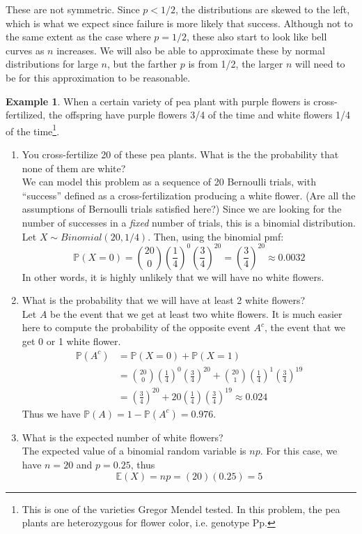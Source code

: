 \documentclass[12pt]{article}
\theoremstyle{definition}
\newtheorem*{example}{Example}
\theoremstyle{remark}
\def\P{{\mathbb P}}
\def\E{{\mathbb E}}
\begin{document}
These are not symmetric. Since $p < 1/2$, the distributions are skewed to the left, which is what we expect since failure is more likely that success. Although not to the same extent as the case where $p = 1/2$, these also start to look like bell curves as $n$ increases. We will also be able to approximate these by normal distributions for large $n$, but the farther $p$ is from 1/2, the larger $n$ will need to be for this approximation to be reasonable.

\begin{example}When a certain variety of pea plant with purple flowers is cross-fertilized, the offspring have purple flowers 3/4 of the time and white flowers 1/4 of the time\footnote{This is one of the varieties Gregor Mendel tested. In this problem, the pea plants are heterozygous for flower color, i.e. genotype Pp.}. 
\begin{enumerate}
\item You cross-fertilize 20 of these pea plants. What is the the probability that none of them are white?\\

We can model this problem as a sequence of 20 Bernoulli trials, with ``success'' defined as a cross-fertilization producing a white flower. (Are all the assumptions of Bernoulli trials satisfied here?) Since we are looking for the number of successes in a \emph{fixed} number of trials, this is a binomial distribution. Let $X \sim Binomial(20, 1/4)$. Then, using the binomial pmf:
\[
\P(X = 0) = \binom{20}{0}\left(\frac{1}{4}\right)^0 \left(\frac{3}{4}\right)^{20} = \left(\frac{3}{4}\right)^{20} \approx 0.0032
\]
In other words, it is highly unlikely that we will have no white flowers.

\item What is the probability that we will have at least 2 white flowers?\\

Let $A$ be the event that we get at least two white flowers. It is much easier here to compute the probability of the opposite event $A^c$, the event that we get 0 or 1 white flower. 
\begin{align*}
\P(A^c) &= \P(X = 0) + \P(X = 1) \\
&= \binom{20}{0}\left(\frac{1}{4}\right)^0 \left(\frac{3}{4}\right)^{20} + \binom{20}{1}\left(\frac{1}{4}\right)^1 \left(\frac{3}{4}\right)^{19} \\
&= \left(\frac{3}{4}\right)^{20} + 20 \left(\frac{1}{4}\right) \left(\frac{3}{4}\right)^{19} \approx 0.024
\end{align*}
Thus we have $\P(A) = 1 - \P(A^c) = 0.976$.

\item What is the expected number of white flowers? \\

The expected value of a binomial random variable is $np$. For this case, we have $n = 20$ and $p = 0.25$, thus
\[
\E(X) = n p = (20)(0.25) = 5
\]
\end{enumerate} 
\end{example}
\end{document}
